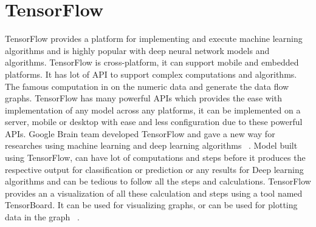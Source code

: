 \section{TensorFlow}

TensorFlow provides a platform for implementing and execute machine learning 
algorithms and is highly popular with deep neural network models and 
algorithms. TensorFlow is cross-platform, it can support mobile and embedded 
platforms. It has lot of API to support complex computations and algorithms.
The famous computation in on the numeric data and generate the data flow 
graphs. TensorFlow has many powerful APIs which provides the ease with 
implementation of any model across any platforms, it can be implemented on 
a server, mobile or desktop with ease and less configuration due to these 
powerful APIs. Google Brain team developed TensorFlow and gave a new way 
for researches using machine learning and deep learning algorithms
~\cite{hid-sp18-520-TensorFlow}.
Model built using TensorFlow, can have lot of computations and steps before 
it produces the respective output for classification or prediction or any 
results for Deep learning algorithms and can be tedious to follow all the 
steps and calculations. TensorFlow provides an a visualization of all these 
calculation and steps using a tool named TensorBoard. It can be used for 
visualizing graphs, or can be used for plotting data in the graph
~\cite{hid-sp18-520-TensorFlowboard}.
